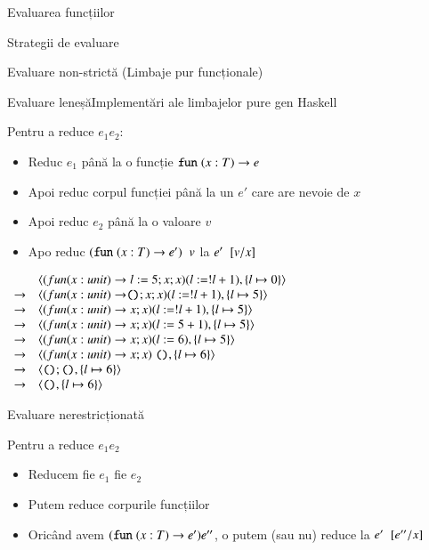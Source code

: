 \documentclass[xcolor=pdftex,romanian,colorlinks]{beamer}
\begin{document}
\begin{section}{Evaluarea funcțiilor}
\begin{subsection}{Strategii de evaluare}
\begin{frame}{Evaluare non-strictă (Limbaje pur funcționale)}
\end{frame}

\begin{frame}{Evaluare leneșă}{Implementări ale limbajelor pure gen Haskell}
\begin{block}{}
Pentru a reduce $e_1 \mathrel{} e_2$:
\begin{itemize}
\item  Reduc $e_1$ până la o funcție
$\mathrel{\text{\ttfamily fun}} (x : T) \rightarrow e$
\item Apoi reduc corpul funcției  până la un $e'$ care are nevoie de $x$
\item Apoi reduc $e_2$ până la o valoare $v$
\item Apo reduc $(\mathrel{\text{\ttfamily fun}} (x : T) \rightarrow e')\mathrel{} v$ la $e'\mathrel{}[v/x]$

\end{itemize}
\end{block}
\hfill $\begin{array}{ll}
& {\langle{(fun (x : unit) \rightarrow l := 5 ; x ; x) (l := !l + 1), \{l \mapsto 0\}}\rangle} \\
\rightarrow& {\langle{(fun (x : unit) \rightarrow \ensuremath\mathrel{\text{\ttfamily ()}}; x ; x) (l := !l + 1), \{l \mapsto 5\}}\rangle} \\
\rightarrow& {\langle{(fun (x : unit) \rightarrow x ; x) (l := !l + 1), \{l \mapsto 5\}}\rangle} \\
\rightarrow& {\langle{(fun (x : unit) \rightarrow x ; x) (l := 5 + 1), \{l \mapsto 5\}}\rangle} \\
\rightarrow& {\langle{(fun (x : unit) \rightarrow x ; x) (l := 6), \{l \mapsto 5\}}\rangle} \\
\rightarrow& {\langle{(fun (x : unit) \rightarrow x ; x) \ensuremath\mathrel{\text{\ttfamily ()}}, \{l \mapsto 6\}}\rangle} \\
\rightarrow& {\langle{\ensuremath\mathrel{\text{\ttfamily ()}}; \ensuremath\mathrel{\text{\ttfamily ()}}, \{l \mapsto 6\}}\rangle} \\
\rightarrow& {\langle{\ensuremath\mathrel{\text{\ttfamily ()}}, \{l \mapsto 6\}}\rangle} \\
\end{array}$ \hfill\;

\end{frame}


\begin{frame}{Evaluare nerestricționată}
\begin{block}{}
Pentru a reduce $e_1 \mathrel{} e_2$
\begin{itemize}
\item Reducem fie $e_1$ fie $e_2$
\item Putem reduce corpurile funcțiilor
\item Oricând avem  $(\mathrel{\text{\ttfamily fun}} (x : T) \rightarrow e') e''$, o putem (sau nu)
reduce la $e'\mathrel{}[e''/x]$
\end{itemize} 
\end{block}
\end{frame}


\end{subsection}
\end{section}
\end{document}
